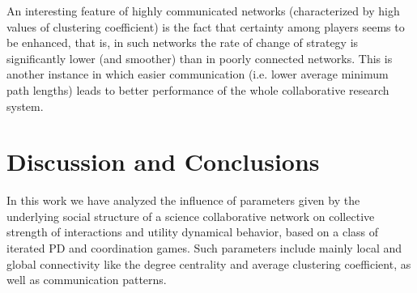 \documentclass[11pt]{article}
\begin{document}
\FloatBarrier

An interesting feature of highly communicated networks (characterized
by high values of clustering coefficient) is the fact that certainty
among players seems to be enhanced, that is, in such networks the rate
of change of strategy is significantly lower (and smoother) than in
poorly connected networks. This is another instance in which easier
communication (i.e. lower average minimum path lengths) leads to better
performance of the whole collaborative research system.\\


\section{Discussion and Conclusions}
\label{sec:3}

{\color{red}In this work we have analyzed the influence of parameters
  given by the underlying social structure of a science collaborative
  network on collective strength of interactions and utility dynamical
  behavior, based on a class of iterated PD and coordination
  games. Such parameters include mainly local and global connectivity
  like the degree centrality and average clustering coefficient, as
  well as communication patterns.}\\
\end{document}
